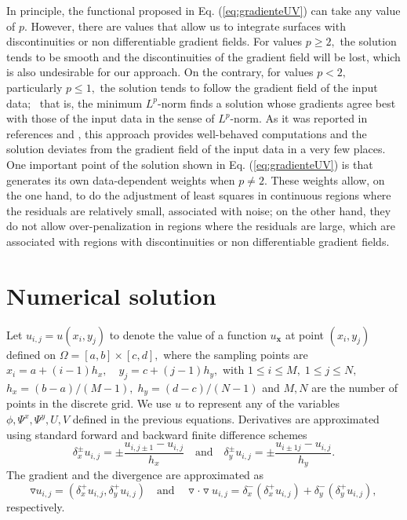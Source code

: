 \documentclass[12pt,letterpaper]{article}
\begin{document}
In principle, the functional proposed in Eq. (\ref{eq:gradienteUV}) can take any value of $p$. However, there are values that allow us to integrate surfaces with discontinuities or non differentiable gradient fields. For values $p \geq  2,$ the solution tends to be smooth and the discontinuities of the gradient field will be lost, which is also undesirable for our approach. On the contrary, for values $p < 2,$ particularly $p \leq 1,$ the solution tends to follow the gradient field of the input data;~\cite{Bloomfield1983,Scales1988} that is, the minimum $L^{p}$-norm finds a solution whose gradients agree best with those of the input data in the sense of $L^{p}$-norm. As it was reported in references  and , this approach provides well-behaved computations and the solution deviates from the gradient field of the input data in a very few places. One important point of the solution shown in Eq. (\ref{eq:gradienteUV}) is that generates its own data-dependent weights when $p \neq 2.$ These weights allow, on the one hand, to do the adjustment of least squares in continuous regions where the residuals are relatively small, associated with noise; on the other hand, they do not allow over-penalization in regions where the residuals are large, which are associated with regions with discontinuities or non differentiable gradient fields.



\section{Numerical solution}\label{sec:numerical}
Let $u_{i,j} = u(x_i,y_j)$ to denote the value of a function $u_{\mathbf{x}}$ at point $(x_i,y_j)$ defined on $\Omega = [a,b]\times[c,d],$ where the sampling points are $x_i = a + (i-1)h_x,\quad y_j = c + (j-1)h_y,$ with $1 \leq i \leq M,\; 1 \leq j \leq N,$ $h_x = (b-a)/(M-1),\; h_y = (d-c)/(N-1)$ and $M, N$ are the number of points in the discrete grid. We use $u$ to represent any of the variables $\phi,\Psi^{x},\Psi^{y}, U, V$ defined in the previous equations. Derivatives are approximated using standard forward and backward finite difference schemes \[\delta_{x}^{\pm}u_{i,j} = \pm\frac{u_{i,j\pm 1}-u_{i,j}}{h_x}\quad\text{and}\quad\delta_{y}^{\pm}u_{i,j} = \pm\frac{u_{i\pm 1j}-u_{i,j}}{h_y}.\]  The gradient and the divergence are approximated as \[\triangledown  u_{i,j} = (\delta_{x}^{+}u_{i,j},\delta_{y}^{+}u_{i,j})\quad\text{and}\quad\triangledown\cdot\triangledown  u_{i,j} = \delta_{x}^{-} (\delta_{x}^{+}u_{i,j}) + \delta_{y}^{-}(\delta_{y}^{+}u_{i,j}),\] respectively. 
\end{document}
